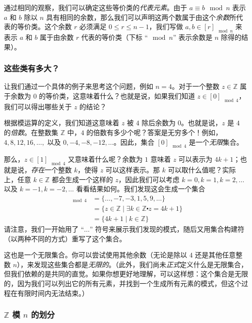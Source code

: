 通过相同的观察，我们可以确定这些等价类的\emph{代表元素}。由于 $a \equiv b \mod n$ 表示 $a$ 和 $b$ 除以 $n$ 具有相同的余数，那么我们可以声明这两个数属于由这个\emph{余数}所代表的等价类。这个余数 $r$ 必须满足 $0 \le r \le n-1$，我们写做 $a, b \in [r]_{\mod n}$ 来表示 $a$ 和 $b$ 属于由余数 $r$ 代表的等价类（下标 ``$\mod n$'' 表示余数是 $n$ 除得的结果）。

\subsubsection*{这些类有多大？}

让我们通过一个具体的例子来思考这个问题，例如 $n = 4$。对于一个整数 $z \in \mathbb{Z}$ 属于余数为 $0$ 的等价类，这意味着什么？也就是说，如果我们知道 $z \in [0]_{\mod 4}$，我们可以得出哪些关于 $z$ 的结论？

根据模运算的定义，我们知道这意味着 $z$ 被 $4$ 除后余数为 $0$。也就是说，$z$ 是 $4$ 的\emph{倍数}。在整数集 $\mathbb{Z}$ 中，$4$ 的倍数有多少个呢？答案是无穷多个！例如，$4, 8, 12, 16, \dots ,$ 以及 $0,-4,-8,-12,\dots$。因此，集合 $[0]_{\mod 4}$ 是一个\emph{无限}集合。

那么，$z \in [1]_{\mod 4}$ 又意味着什么呢？余数为 $1$ 意味着 $z$ 可以表示为 $4k + 1$；也就是说，\emph{存在}一个整数 $k$，使得 $z$ 可以这样表示。那 $k$ 可以取什么值呢？实际上，任意 $k \in \mathbb{Z}$ 都会生成一个这样的 $z$，因此我们可以考虑 $k = 0, k = 1, k = 2, \dots$ 以及 $k = -1, k = -2, \dots$ 看看结果如何。我们发现这会生成一个集合
\begin{align*}
    [1]_{\mod 4} &= \{\dots , -7, -3, 1, 5, 9, \dots \} \\
    &= \{z \in \mathbb{Z} \mid \exists k \in \mathbb{Z} \centerdot z = 4k + 1\} \\
    &= \{4k + 1 \mid k \in \mathbb{Z}\}
\end{align*}
请注意，我们一开始用了 ``$\dots$'' 符号来展示我们发现的模式，随后又用集合构建符（以两种不同的方式）重写了这个集合。

这也是一个无限集合。你可以尝试使用其他余数（无论是除以 $4$ 还是其他任意整数 $n$），来发现这些集合都是\emph{无限的}。（此外，我们尚未\emph{正式}定义什么是无限集合，但我们依赖的是共同的直觉。如果你想更好地理解，可以这样想：这个集合是无限的，因为我们可以列出它的所有元素，并找到一个生成所有元素的模式，但这个过程在有限时间内无法结束。）

\subsubsection*{$\mathbb{Z}$ 模 $n$ 的划分}

